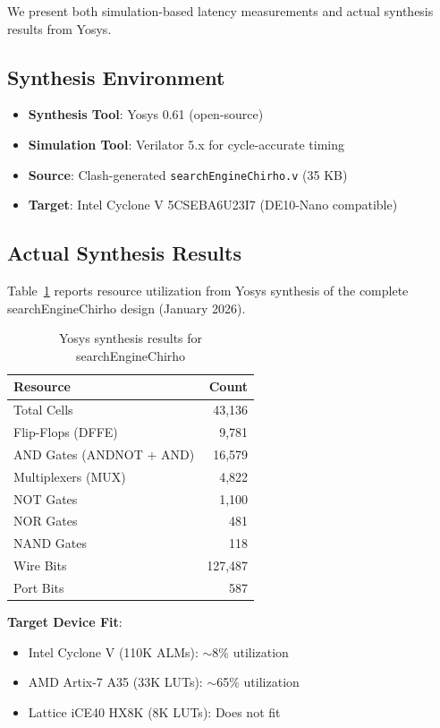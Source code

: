 \documentclass[11pt,a4paper]{article}
\begin{document}
We present both simulation-based latency measurements and actual synthesis
results from Yosys.

\subsection{Synthesis Environment}
\label{subsec:synthesis_env_chirho}

\begin{itemize}
  \item \textbf{Synthesis Tool}: Yosys 0.61 (open-source)
  \item \textbf{Simulation Tool}: Verilator 5.x for cycle-accurate timing
  \item \textbf{Source}: Clash-generated \texttt{searchEngineChirho.v} (35 KB)
  \item \textbf{Target}: Intel Cyclone V 5CSEBA6U23I7 (DE10-Nano compatible)
\end{itemize}

\subsection{Actual Synthesis Results}
\label{subsec:actual_synthesis_chirho}

Table~\ref{tab:yosys_results_chirho} reports resource utilization from Yosys
synthesis of the complete searchEngineChirho design (January 2026).

\begin{table}[ht]
\centering
\caption{Yosys synthesis results for searchEngineChirho}
\label{tab:yosys_results_chirho}
\begin{tabular}{lr}
\toprule
\textbf{Resource} & \textbf{Count} \\
\midrule
Total Cells & 43,136 \\
Flip-Flops (DFFE) & 9,781 \\
AND Gates (ANDNOT + AND) & 16,579 \\
Multiplexers (MUX) & 4,822 \\
NOT Gates & 1,100 \\
NOR Gates & 481 \\
NAND Gates & 118 \\
Wire Bits & 127,487 \\
Port Bits & 587 \\
\bottomrule
\end{tabular}
\end{table}

\textbf{Target Device Fit}:
\begin{itemize}
  \item Intel Cyclone V (110K ALMs): $\sim$8\% utilization
  \item AMD Artix-7 A35 (33K LUTs): $\sim$65\% utilization
  \item Lattice iCE40 HX8K (8K LUTs): Does not fit
\end{itemize}
\end{document}
